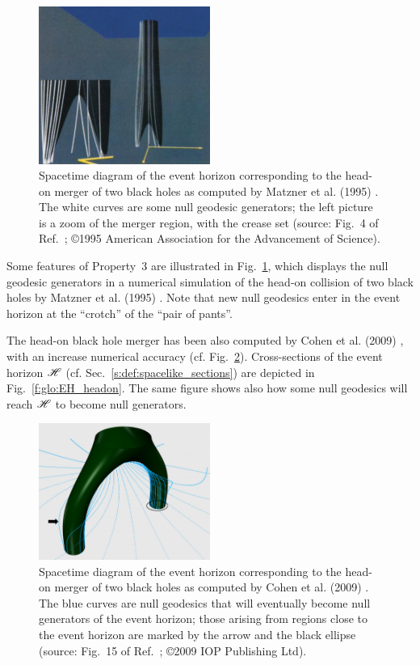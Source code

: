 \begin{figure}
\centerline{\includegraphics[width=0.5\textwidth]{glo_BH_headon_gener.jpg}}
\caption[]{\label{f:glo:BH_headon_gener} \footnotesize
Spacetime diagram of the event horizon corresponding to the head-on merger of
two black holes as computed by Matzner et al. (1995) \cite{Matzn_al95}. The
white curves are some null geodesic generators; the left picture is a zoom of
the merger region, with the crease set
(source: Fig.~4 of Ref.~\cite{Matzn_al95}; \copyright 1995 American Association for the Advancement of Science).}
\end{figure}



Some features of Property~3 are illustrated in Fig.~\ref{f:glo:BH_headon_gener},
which displays the null geodesic generators in a numerical simulation
of the head-on collision of two black holes by Matzner et al. (1995) \cite{Matzn_al95}.
Note that new null geodesics enter in the event horizon at the ``crotch'' of the
``pair of pants''.

The head-on black hole merger has been also computed by Cohen et al. (2009) \cite{CohenPS09}, with an increase numerical accuracy (cf. Fig.~\ref{f:glo:EH_headon_3d}).
Cross-sections of the event horizon $\mathscr{H}$ (cf. Sec.~\ref{s:def:spacelike_sections})
are depicted in Fig.~\ref{f:glo:EH_headon}. The same figure shows also how
some null geodesics will reach $\mathscr{H}$ to become null generators.


\begin{figure}
\centerline{\includegraphics[width=0.5\textwidth]{glo_EH_headon_3d.jpg}}
\caption[]{\label{f:glo:EH_headon_3d} \footnotesize
Spacetime diagram of the event horizon corresponding to the head-on merger of
two black holes as computed by Cohen et al. (2009) \cite{CohenPS09}.
The blue curves are null geodesics that will eventually become null generators
of the event horizon; those arising from regions close to the event horizon
are marked by the arrow and the black ellipse
(source: Fig.~15 of Ref.~\cite{CohenPS09}; \copyright 2009 IOP Publishing Ltd).}
\end{figure}

